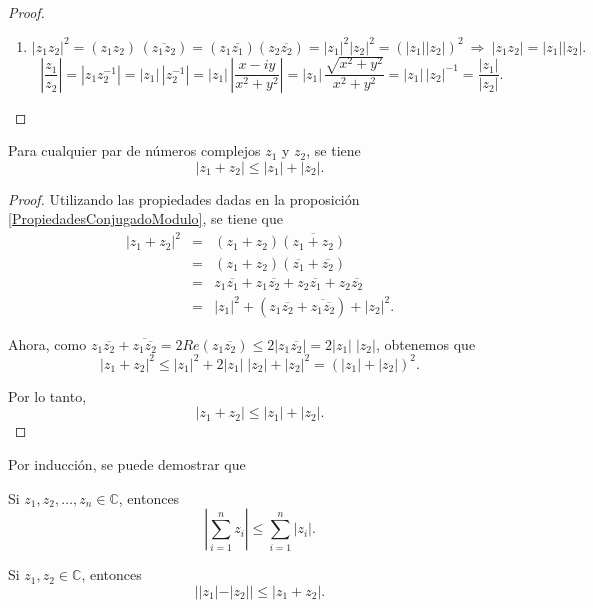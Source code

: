 \begin{proof}
\begin{enumerate}
\item 
\begin{equation*}
|z_1 z_2|^2 = (z_1 z_2) \, (\overline{z_1z_2}) = (z_1 \overline{z_1}) (z_2 \overline{z_2}) = |z_1|^2|z_2|^2 = (|z_1||z_2|)^2 ~\Rightarrow~ |z_1 z_2| = |z_1||z_2|.
\end{equation*}
\begin{equation*}
\left| \frac{z_1}{z_2} \right| = \left|z_1 z_2^{-1}\right| = |z_1| \, |z_2^{-1}| = |z_1| \, \left| \frac{x-iy}{x^2+y^2} \right| = |z_1| \, \frac{\sqrt{x^2+y^2}}{x^2+y^2} = |z_1| \,|z_2|^{-1} = \frac{|z_1|}{|z_2|}.
\end{equation*}

\end{enumerate}
\end{proof}

\begin{propo}
Para cualquier par de números complejos $z_1$ y $z_2$, se tiene
$$|z_1 + z_2| \leq |z_1| + |z_2|.$$
\end{propo}

\begin{proof}
Utilizando las propiedades dadas en la proposición \ref{PropiedadesConjugadoModulo}, se tiene que
\begin{eqnarray*}
|z_1 + z_2|^2 &=& (z_1 + z_2) \overline{(z_1 + z_2)} \\
&=& (z_1 + z_2)(\overline{z_1} + \overline{z_2}) \\
&=& z_1 \overline{z_1} + z_1 \overline{z_2} + z_2 \overline{z_1} + z_2 \overline{z_2} \\
&=& |z_1|^2 + (z_1 \overline{z_2} + \overline{z_1 \overline{z_2}}) + |z_2|^2.
\end{eqnarray*}

Ahora, como $z_1 \overline{z_2} + \overline{z_1 \overline{z_2}}= 2 Re(z_1 \overline{z_2}) \leq 2 |z_1 \overline{z_2}| = 2 |z_1| \; |z_2|$, obtenemos que
$$|z_1 + z_2|^2 \leq |z_1|^2 + 2  |z_1| \; |z_2| + |z_2|^2 = (|z_1| + |z_2|)^2.$$

Por lo tanto,
$$|z_1 + z_2| \leq |z_1| + |z_2|.$$
\end{proof}

Por inducción, se puede demostrar que
\begin{corolario}
Si $z_1, z_2, \dots, z_n \in \mathbb{C}$, entonces
$$\left| \sum_{i=1}^n z_i \right| \leq \sum_{i=1}^n |z_i|.$$
\end{corolario}

\begin{corolario}
Si $z_1, z_2 \in \mathbb{C}$, entonces
$$||z_1| - |z_2|| \leq |z_1 + z_2|.$$
\end{corolario}

